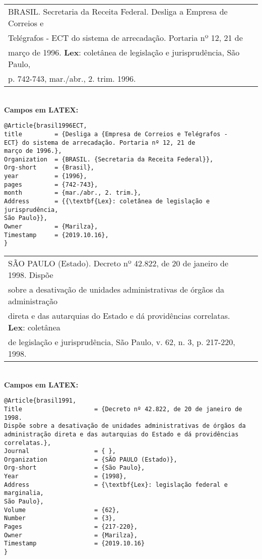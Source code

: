 \begin{tabular}{|l|c|} \hline
	BRASIL. Secretaria da Receita Federal. Desliga a Empresa de Correios e \\ Telégrafos - ECT do sistema de arrecadação. Portaria nº 12, 21 de \\ março de 1996. \textbf{Lex}: coletânea de legislação e jurisprudência, São Paulo,\\ p. 742-743,
	mar./abr., 2. trim. 1996. 
	\\\hline
\end{tabular} \\

\textbf{Campos em LATEX:} 


\begin{verbatim}
@Article{brasil1996ECT,
title         = {Desliga a {Empresa de Correios e Telégrafos - 
ECT} do sistema de arrecadação. Portaria nº 12, 21 de
março de 1996.},
Organization  = {BRASIL. {Secretaria da Receita Federal}},
Org-short     = {Brasil},
year          = {1996},
pages         = {742-743},
month         = {mar./abr., 2. trim.},
Address       = {{\textbf{Lex}: coletânea de legislação e jurisprudência, 
São Paulo}},
Owner         = {Marilza},
Timestamp     = {2019.10.16}, 
}
\end{verbatim}


\begin{tabular}{|l|c|} \hline
	SÃO PAULO (Estado). Decreto nº 42.822, de 20 de janeiro de 1998. Dispõe \\ sobre a desativação de unidades administrativas de órgãos da administração \\
	direta e das autarquias do Estado e dá providências correlatas. \textbf{Lex}: coletânea \\ de legislação e jurisprudência, São Paulo, v. 62, n. 3, p. 217-220,
	1998.
	\\\hline
\end{tabular} \\

\textbf{Campos em LATEX:} 


\begin{verbatim}
@Article{brasil1991,
Title                    = {Decreto nº 42.822, de 20 de janeiro de 1998. 
Dispõe sobre a desativação de unidades administrativas de órgãos da 
administração direta e das autarquias do Estado e dá providências 
correlatas.},
Journal                  = { },
Organization             = {SÃO PAULO (Estado)},
Org-short                = {São Paulo},
Year                     = {1998},
Address                  = {\textbf{Lex}: legislação federal e marginalia, 
São Paulo},
Volume                   = {62},
Number                   = {3},
Pages                    = {217-220},
Owner                    = {Marilza},
Timestamp                = {2019.10.16}
}
\end{verbatim}
